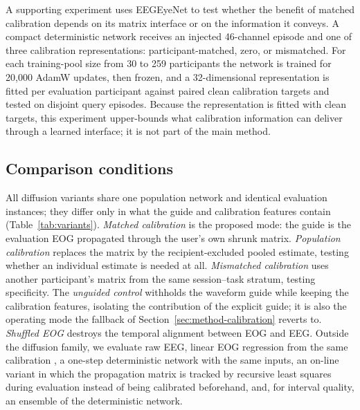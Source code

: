 A supporting experiment uses EEGEyeNet \cite{kastrati2021eegeyenet} to test whether the benefit of matched calibration depends on its matrix interface or on the information it conveys. A compact deterministic network receives an injected 46-channel episode and one of three calibration representations: participant-matched, zero, or mismatched. For each training-pool size from 30 to 259 participants the network is trained for 20{,}000 AdamW updates, then frozen, and a 32-dimensional representation is fitted per evaluation participant against paired clean calibration targets and tested on disjoint query episodes. Because the representation is fitted with clean targets, this experiment upper-bounds what calibration information can deliver through a learned interface; it is not part of the main method.

\subsection{Comparison conditions}
\label{sec:exp-comparisons}

All diffusion variants share one population network and identical evaluation instances; they differ only in what the guide and calibration features contain (Table~\ref{tab:variants}). \emph{Matched calibration} is the proposed mode: the guide is the evaluation EOG propagated through the user's own shrunk matrix. \emph{Population calibration} replaces the matrix by the recipient-excluded pooled estimate, testing whether an individual estimate is needed at all. \emph{Mismatched calibration} uses another participant's matrix from the same session--task stratum, testing specificity. The \emph{unguided control} withholds the waveform guide while keeping the calibration features, isolating the contribution of the explicit guide; it is also the operating mode the fallback of Section~\ref{sec:method-calibration} reverts to. \emph{Shuffled EOG} destroys the temporal alignment between EOG and EEG. Outside the diffusion family, we evaluate raw EEG, linear EOG regression from the same calibration \cite{gratton1983ocular}, a one-step deterministic network with the same inputs, an on-line variant in which the propagation matrix is tracked by recursive least squares during evaluation instead of being calibrated beforehand, and, for interval quality, an ensemble of the deterministic network.

